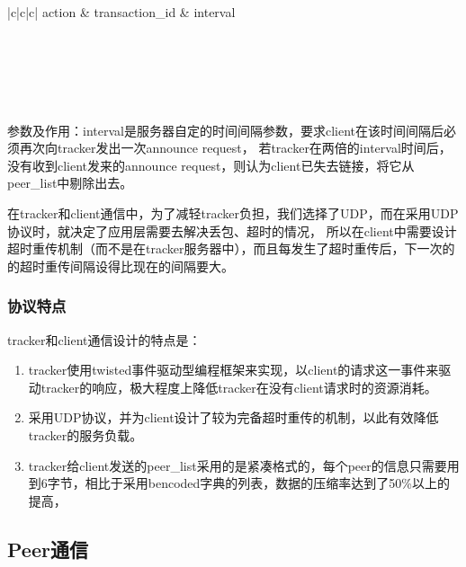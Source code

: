 \documentclass[15pt]{ctexart}
\begin{document}
			\begin{table}[H]
				\centering
				\begin{tabular}{|c|c|c|}
					\hline
					action & transaction\_id & interval \\
					\hline
					\\
					\\
					\\
					\\
					\\
					\hline
				\end{tabular}
				\caption{服务器announce response}
			\end{table}
			\par 参数及作用：interval是服务器自定的时间间隔参数，要求client在该时间间隔后必须再次向tracker发出一次announce request，
			若tracker在两倍的interval时间后，没有收到client发来的announce request，则认为client已失去链接，将它从peer\_list中剔除出去。
			\\
			\par 在tracker和client通信中，为了减轻tracker负担，我们选择了UDP，而在采用UDP协议时，就决定了应用层需要去解决丢包、超时的情况，
			所以在client中需要设计超时重传机制（而不是在tracker服务器中），而且每发生了超时重传后，下一次的的超时重传间隔设得比现在的间隔要大。
		\subsubsection{协议特点} %
		\label{ssub:协议特点}
			tracker和client通信设计的特点是：
			\begin{enumerate}
				\item tracker使用twisted事件驱动型编程框架来实现，以client的请求这一事件来驱动tracker的响应，极大程度上降低tracker在没有client请求时的资源消耗。
				\item 采用UDP协议，并为client设计了较为完备超时重传的机制，以此有效降低tracker的服务负载。
				\item tracker给client发送的peer\_list采用的是紧凑格式的，每个peer的信息只需要用到6字节，相比于采用bencoded字典的列表，数据的压缩率达到了50\%以上的提高，			
			\end{enumerate}		
	\subsection{Peer通信} %
	\label{sub:peer通信}
		
\end{document}
